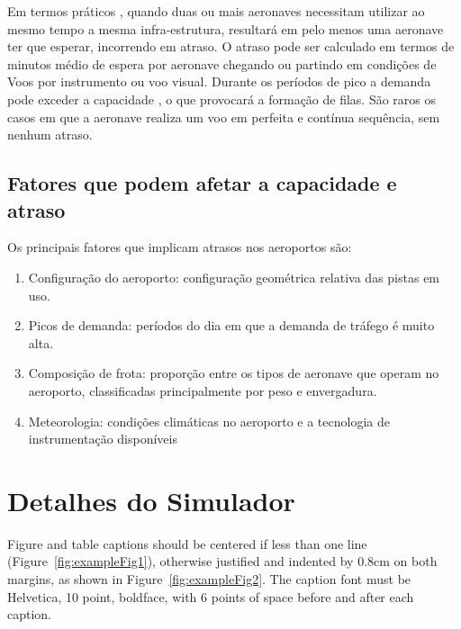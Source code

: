 \documentclass[12pt]{article}
\begin{document}
Em termos práticos , quando duas ou mais aeronaves necessitam utilizar ao
mesmo tempo a mesma infra-estrutura, resultará em pelo menos uma aeronave 
ter que esperar, incorrendo em atraso. O atraso pode ser calculado em termos
de minutos médio de espera por aeronave chegando ou partindo em condições 
de Voos por instrumento ou voo visual. Durante os períodos de pico a demanda
pode exceder a capacidade , o que provocará a formação de filas. São raros
os casos em que a aeronave realiza um voo em perfeita e contínua sequência,
sem nenhum atraso. 

\subsection{Fatores que podem afetar a capacidade e atraso}

Os principais fatores que implicam atrasos nos aeroportos são:


\begin{enumerate}
  
  \item Configuração do aeroporto: configuração geométrica relativa das pistas 
    em uso.

  \item Picos de demanda: períodos do dia em que a demanda de tráfego é muito
    alta.

  \item Composição de frota: proporção entre os tipos de aeronave que operam no 
  aeroporto, classificadas principalmente por peso e envergadura.

  \item Meteorologia: condições climáticas no aeroporto e a tecnologia de 
  instrumentação disponíveis

\end{enumerate}


\section{Detalhes do Simulador}


Figure and table captions should be centered if less than one line
(Figure~\ref{fig:exampleFig1}), otherwise justified and indented by 0.8cm on
both margins, as shown in Figure~\ref{fig:exampleFig2}. The caption font must
be Helvetica, 10 point, boldface, with 6 points of space before and after each
caption.
\end{document}
